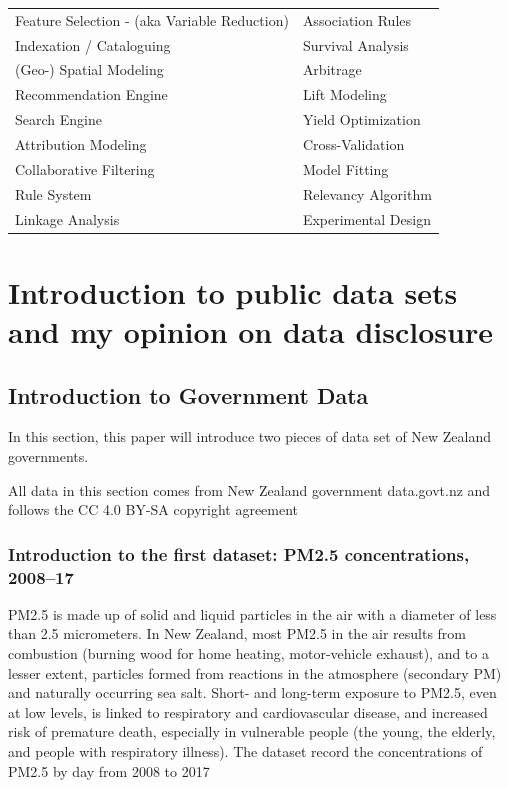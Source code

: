 \documentclass[a4paper, 11pt,twoside=true]{scrartcl}
\begin{document}
\begin{table}[h]
\begin{tabular}{ll}
		Feature Selection - (aka Variable Reduction) & Association Rules                    \\
		Indexation / Cataloguing                     & Survival Analysis                    \\
		(Geo-) Spatial Modeling                      & Arbitrage                            \\
		Recommendation Engine                        & Lift Modeling                        \\
		Search Engine                                & Yield Optimization                   \\
		Attribution Modeling                         & Cross-Validation                     \\
		Collaborative Filtering                      & Model Fitting                        \\
		Rule System                                  & Relevancy Algorithm                  \\
		Linkage Analysis                             & Experimental Design                 
	\end{tabular}
\end{table}

\newpage
\section{Introduction to public data sets and my opinion on data disclosure}
\subsection{Introduction to Government Data}
\qquad In this section, this paper will introduce two pieces of data set of New Zealand governments.

\quad All data in this section comes from New Zealand government data.govt.nz and follows the CC 4.0 BY-SA copyright agreement
\subsubsection{Introduction to the first dataset: PM2.5 concentrations, 2008–17}
\qquad PM2.5 is made up of solid and liquid particles in the air with a diameter of less than 2.5 micrometers. In New Zealand, most PM2.5 in the air results from combustion (burning wood for home heating, motor-vehicle exhaust), and to a lesser extent, particles formed from reactions in the atmosphere (secondary PM) and naturally occurring sea salt. Short- and long-term exposure to PM2.5, even at low levels, is linked to respiratory and cardiovascular disease, and increased risk of premature death, especially in vulnerable people (the young, the elderly, and people with respiratory illness). The dataset record the concentrations of PM2.5 by day from 2008 to 2017
\end{document}
